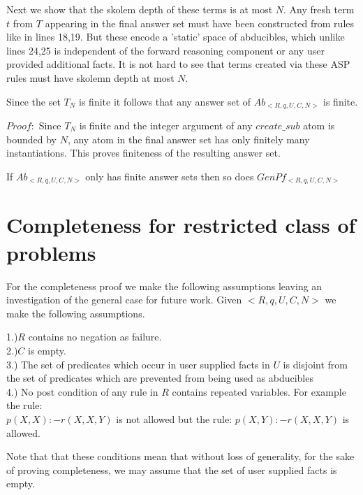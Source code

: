 \documentclass{article}
\begin{document}
Next we show that the skolem depth of these terms is at most $N$. Any fresh term $t$ from $T$ appearing in the final answer set must have been constructed from rules like in lines 18,19. But these encode a 'static' space of abducibles, which unlike lines 24,25 is independent of the forward reasoning component or any user provided additional facts. It is not hard to see that terms created via these ASP rules must have skolemn depth at most $N$. 
\begin{lemma}
Since the set $T_{N}$ is finite it follows that any answer set of $Ab_{<R,q,U,C,N>}$ is finite.\\
\end{lemma}

$Proof:$ Since $T_{N}$ is finite and the integer argument of any $create\_sub$ atom is bounded by $N$, any atom in the final answer set has only finitely many instantiations. This proves finiteness of the resulting answer set. 
\begin{lemma}
If $Ab_{<R,q,U,C,N>}$ only has finite answer sets then so does $GenPf_{<R,q,U,C,N>}$
\end{lemma}

\section{Completeness for restricted class of problems}\label{sec:completeness}
For the completeness proof we make the following assumptions leaving an investigation of the general case for future work. Given $<R,q,U,C,N>$ we make the following assumptions.

1.)$R$ contains no negation as failure.\\
2.)$C$ is empty.\\
3.) The set of predicates which occur in user supplied facts in $U$ is disjoint from the set of predicates which are prevented from being used as abducibles\\
4.) No post condition of any rule in $R$ contains repeated variables. For example the rule:\\
$p(X,X):-r(X,X,Y)$ is not allowed but the rule: $p(X,Y):-r(X,X,Y)$ is allowed.

Note that that these conditions mean that without loss of generality, for the sake of proving completeness, we may assume that the set of user supplied facts is empty.
\end{document}
